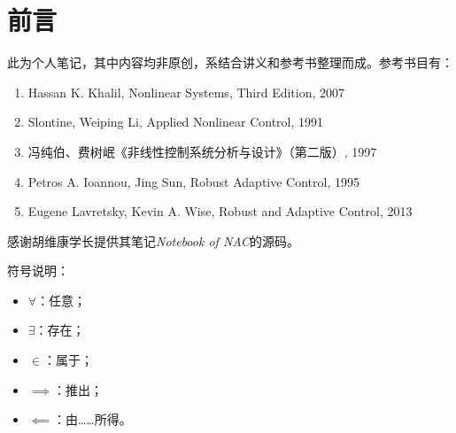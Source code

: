 \chapter*{前言}
此为个人笔记，其中内容均非原创，系结合讲义和参考书整理而成。参考书目有：
\begin{enumerate}
    \item Hassan K. Khalil, Nonlinear Systems, Third Edition, 2007
    \item Slontine, Weiping Li, Applied   Nonlinear    Control, 1991
    \item 冯纯伯、费树岷《非线性控制系统分析与设计》（第二版）, 1997
    \item Petros A. Ioannou, Jing Sun, Robust Adaptive Control, 1995
    \item Eugene Lavretsky, Kevin A. Wise, Robust and Adaptive Control, 2013
\end{enumerate}

感谢胡维康学长提供其笔记{\it Notebook of NAC}的源码。

符号说明：
\begin{itemize}
    \item $\forall$：任意；
    \item $\exists$：存在；
    \item $\in$：属于；
    \item $\implies$：推出；
    \item $\impliedby$：由……所得。
\end{itemize}
